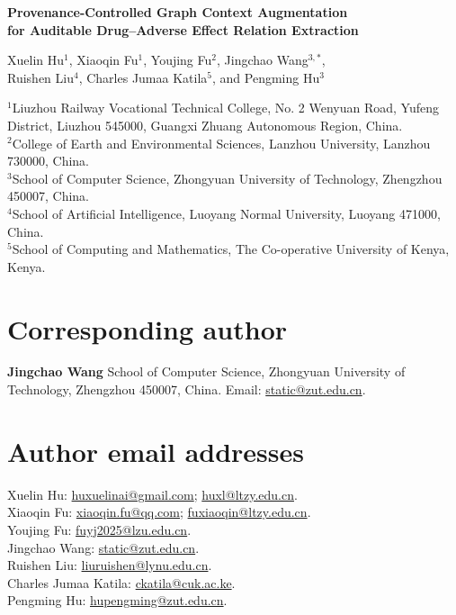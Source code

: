 \documentclass[11pt,a4paper]{article}
\begin{document}
\thispagestyle{empty}

\begin{center}
{\LARGE\bfseries Provenance-Controlled Graph Context Augmentation\\
for Auditable Drug--Adverse Effect Relation Extraction\par}
\vspace{1.2em}
{\large
Xuelin Hu$^{1}$, Xiaoqin Fu$^{1}$, Youjing Fu$^{2}$,
Jingchao Wang$^{3,*}$,\\
Ruishen Liu$^{4}$, Charles Jumaa Katila$^{5}$, and Pengming Hu$^{3}$\par}
\vspace{1em}
\end{center}

\begin{flushleft}\small
$^{1}$Liuzhou Railway Vocational Technical College, No. 2 Wenyuan Road,
Yufeng District, Liuzhou 545000, Guangxi Zhuang Autonomous Region, China.\\
$^{2}$College of Earth and Environmental Sciences, Lanzhou University,
Lanzhou 730000, China.\\
$^{3}$School of Computer Science, Zhongyuan University of Technology,
Zhengzhou 450007, China.\\
$^{4}$School of Artificial Intelligence, Luoyang Normal University,
Luoyang 471000, China.\\
$^{5}$School of Computing and Mathematics, The Co-operative University of Kenya,
Kenya.
\end{flushleft}

\section*{Corresponding author}
\textbf{Jingchao Wang}\quad
School of Computer Science, Zhongyuan University of Technology,
Zhengzhou 450007, China.\quad
Email: \href{mailto:static@zut.edu.cn}{static@zut.edu.cn}.

\section*{Author email addresses}
Xuelin Hu: \href{mailto:huxuelinai@gmail.com}{huxuelinai@gmail.com};
\href{mailto:huxl@ltzy.edu.cn}{huxl@ltzy.edu.cn}.\\
Xiaoqin Fu: \href{mailto:xiaoqin.fu@qq.com}{xiaoqin.fu@qq.com};
\href{mailto:fuxiaoqin@ltzy.edu.cn}{fuxiaoqin@ltzy.edu.cn}.\\
Youjing Fu: \href{mailto:fuyj2025@lzu.edu.cn}{fuyj2025@lzu.edu.cn}.\\
Jingchao Wang: \href{mailto:static@zut.edu.cn}{static@zut.edu.cn}.\\
Ruishen Liu: \href{mailto:liuruishen@lynu.edu.cn}{liuruishen@lynu.edu.cn}.\\
Charles Jumaa Katila: \href{mailto:ckatila@cuk.ac.ke}{ckatila@cuk.ac.ke}.\\
Pengming Hu: \href{mailto:hupengming@zut.edu.cn}{hupengming@zut.edu.cn}.
\end{document}
